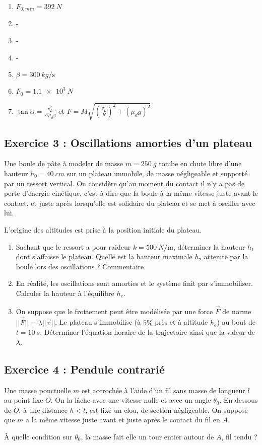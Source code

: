 \begin{enumerate}
	\item $F_{0, min} = \SI{392}{N}$
	\item -
	\item -
	\item -
	\item $\beta = \SI{300}{kg\per\second}$
	\item $F_0 = \SI{1.1e3}{N}$
	\item $\tan\alpha = \frac{v_L^2}{R \mu_d g}$ et $F = M\sqrt{ \left(\frac{v_L^2}{R}\right)^2 + (\mu_d g)^2}$
\end{enumerate}

\subsection{Exercice 3 : Oscillations amorties d'un plateau}

Une boule de pâte à modeler de masse $m = \SI{250}{g}$ tombe en chute libre d'une hauteur $h_0 = \SI{40}{cm}$ sur un plateau immobile, de masse négligeable et supporté par un ressort vertical. On considère qu'au moment du contact il n'y a pas de perte d'énergie cinétique, c'est-à-dire que la boule à la même vitesse juste avant le contact, et juste après lorsqu'elle est solidaire du plateau et se met à osciller avec lui.

L'origine des altitudes est prise à la position initiale du plateau.

\begin{enumerate}
	\item Sachant que le ressort a pour raideur $k = \SI{500}{N\per\meter}$, déterminer la hauteur $h_1$ dont s'affaisse le plateau. Quelle est la hauteur maximale $h_2$ atteinte par la boule lors des oscillations ? Commentaire.
	\item En réalité, les oscillations sont amorties et le système finit par s'immobiliser. Calculer la hauteur à l'équilibre $h_e$.
	\item On suppose que le frottement peut être modélisée par une force $\vec{F}$ de norme $||\vec{F}|| = \lambda ||\vec{v}||$. Le plateau s'immobilise (à $5\%$ près et à altitude $h_e$) au bout de $t = \SI{10}{s}$. Déterminer l'équation horaire de la trajectoire ainsi que la valeur de $\lambda$.
\end{enumerate}

\subsection{Exercice 4 : Pendule contrarié}

Une masse ponctuelle $m$ est accrochée à l'aide d'un fil sans masse de longueur $l$ au point fixe $O$. On la lâche avec une vitesse nulle et avec un angle $\theta_0$. En dessous de $O$, à une distance $h<l$, est fixé un clou, de section négligeable. On suppose que $m$ a la même vitesse juste avant et juste après le contact du fil en $A$.

À quelle condition sur $\theta_0$, la masse fait elle un tour entier autour de $A$, fil tendu ? 

